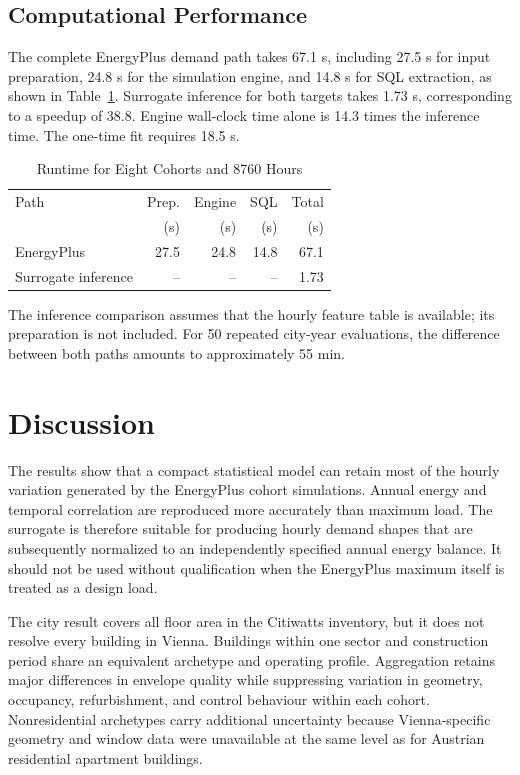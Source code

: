 \documentclass[conference]{IEEEtran}
\begin{document}
\subsection{Computational Performance}

The complete EnergyPlus demand path takes 67.1 s, including 27.5 s for input
preparation, 24.8 s for the simulation engine, and 14.8 s for SQL extraction,
as shown in Table~\ref{tab:runtime}. Surrogate inference for both targets takes
1.73 s, corresponding to a speedup of 38.8. Engine wall-clock time alone is
14.3 times the inference time. The one-time fit requires 18.5 s.

\begin{table}[t]
\caption{Runtime for Eight Cohorts and 8760 Hours}
\label{tab:runtime}
\centering
\footnotesize
\begin{tabular}{lrrrr}
\toprule
Path & Prep. & Engine & SQL & Total \\
 & (s) & (s) & (s) & (s) \\
\midrule
EnergyPlus & 27.5 & 24.8 & 14.8 & 67.1 \\
Surrogate inference & -- & -- & -- & 1.73 \\
\bottomrule
\end{tabular}
\end{table}

The inference comparison assumes that the hourly feature table is available;
its preparation is not included. For 50 repeated city-year evaluations, the
difference between both paths amounts to approximately 55 min.

\section{Discussion}

The results show that a compact statistical model can retain most of the
hourly variation generated by the EnergyPlus cohort simulations. Annual
energy and temporal correlation are reproduced more accurately than maximum
load. The surrogate is therefore suitable for producing hourly demand shapes
that are subsequently normalized to an independently specified annual energy
balance. It should not be used without qualification when the EnergyPlus
maximum itself is treated as a design load.

The city result covers all floor area in the Citiwatts inventory, but it does
not resolve every building in Vienna. Buildings within one sector and
construction period share an equivalent archetype and operating profile.
Aggregation retains major differences in envelope quality while suppressing
variation in geometry, occupancy, refurbishment, and control behaviour within
each cohort. Nonresidential archetypes carry additional uncertainty because
Vienna-specific geometry and window data were unavailable at the same level
as for Austrian residential apartment buildings.
\end{document}
